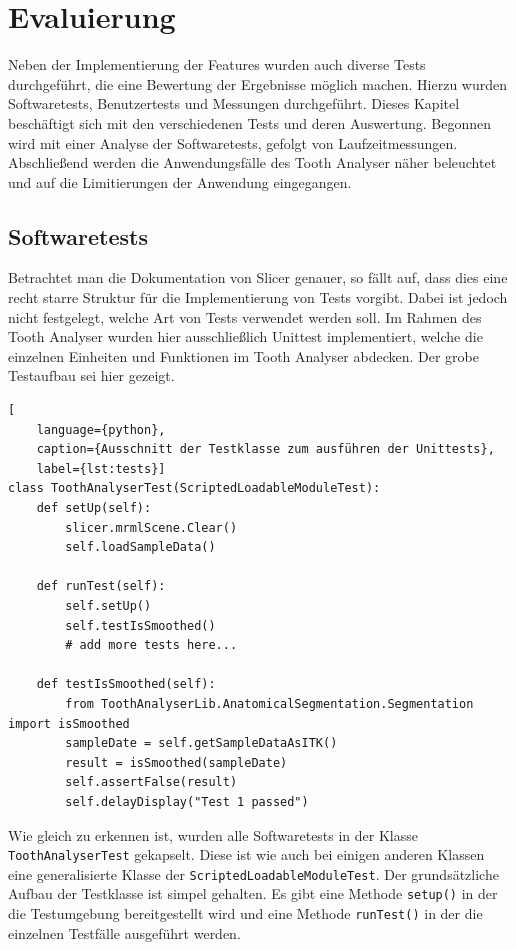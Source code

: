 \chapter{Evaluierung}
\label{subsec:evaluierung} Neben der Implementierung der Features wurden auch diverse
Tests durchgeführt, die eine Bewertung der Ergebnisse möglich machen. Hierzu wurden
Softwaretests, Benutzertests und Messungen durchgeführt. Dieses Kapitel beschäftigt
sich mit den verschiedenen Tests und deren Auswertung. Begonnen wird mit einer
Analyse der Softwaretests, gefolgt von Laufzeitmessungen. Abschließend werden
die Anwendungsfälle des Tooth Analyser näher beleuchtet und auf die
Limitierungen der Anwendung eingegangen.

\section{Softwaretests}
\label{subsec:softwaretests} Betrachtet man die Dokumentation von Slicer genauer,
so fällt auf, dass dies eine recht starre Struktur für die Implementierung von
Tests vorgibt. Dabei ist jedoch nicht festgelegt, welche Art von Tests verwendet
werden soll. Im Rahmen des Tooth Analyser wurden hier ausschließlich Unittest implementiert,
welche die einzelnen Einheiten und Funktionen im Tooth Analyser abdecken. Der grobe
Testaufbau sei hier gezeigt.

\begin{lstlisting}[
    language={python},
    caption={Ausschnitt der Testklasse zum ausführen der Unittests},
    label={lst:tests}]
class ToothAnalyserTest(ScriptedLoadableModuleTest):
    def setUp(self):
	    slicer.mrmlScene.Clear()
	    self.loadSampleData()

    def runTest(self):
	    self.setUp()
	    self.testIsSmoothed()
	    # add more tests here...

    def testIsSmoothed(self):
	    from ToothAnalyserLib.AnatomicalSegmentation.Segmentation import isSmoothed
	    sampleDate = self.getSampleDataAsITK()
 	    result = isSmoothed(sampleDate)
	    self.assertFalse(result)
	    self.delayDisplay("Test 1 passed")
\end{lstlisting}

Wie gleich zu erkennen ist, wurden alle Softwaretests in der Klasse \texttt{ToothAnalyserTest}
gekapselt. Diese ist wie auch bei einigen anderen Klassen eine generalisierte Klasse
der \texttt{ScriptedLoadableModuleTest}. Der grundsätzliche Aufbau der Testklasse
ist simpel gehalten. Es gibt eine Methode \texttt{setup()} in der die Testumgebung
bereitgestellt wird und eine Methode \texttt{runTest()} in der die einzelnen
Testfälle ausgeführt werden.

